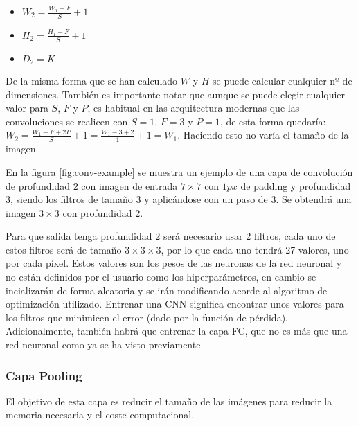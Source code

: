 \begin{itemize}
\item $W_2 = \frac{W_1 - F}{S} + 1$
\item $H_2 = \frac{H_1 - F}{S} + 1$
\item $D_2 = K$
\end{itemize}

De la misma forma que se han calculado $W$ y $H$ se puede calcular cualquier nº de dimensiones. También es importante notar que aunque se puede elegir cualquier valor para $S$, $F$ y $P$, es habitual en las arquitectura modernas que las convoluciones se realicen con $S=1$, $F=3$ y $P=1$, de esta forma quedaría: $W_2 = \frac{W_1-F+2P}{S} + 1 = \frac{W_1 - 3 + 2}{1} + 1 = W_1$. Haciendo esto no varía el tamaño de la imagen.

En la figura \ref{fig:conv-example}\cite{Li2020} se muestra un ejemplo de una capa de convolución de profundidad $2$ con imagen de entrada $7 \times 7$ con $1 px$ de padding y profundidad $3$, siendo los filtros de tamaño $3$ y aplicándose con un paso de $3$. Se obtendrá una imagen $3\times 3$ con profundidad $2$.

Para que salida tenga profundidad $2$ será necesario usar $2$ filtros, cada uno de estos filtros será de tamaño $3\times 3 \times 3$, por lo que cada uno tendrá 27 valores, uno por cada píxel. Estos valores son los pesos de las neuronas de la red neuronal y no están definidos por el usuario como los hiperparámetros, en cambio se incializarán de forma aleatoria y se irán modificando acorde al algoritmo de optimización utilizado. Entrenar una CNN significa encontrar unos valores para los filtros que minimicen el error (dado por la función de pérdida). Adicionalmente, también habrá que entrenar la capa FC, que no es más que una red neuronal como ya se ha visto previamente.


\subsubsection{Capa Pooling}

El objetivo de esta capa es reducir el tamaño de las imágenes para reducir la memoria necesaria y el coste computacional.

